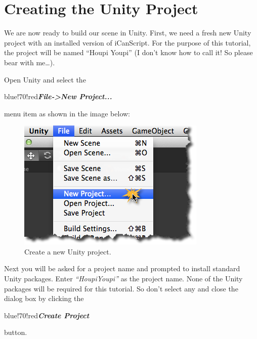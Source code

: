 \chapter{Creating the Unity Project}
\label{creatingtheunityproject}

We are now ready to build our scene in Unity. First, we need a fresh new Unity project with an installed version of iCanScript. For the purpose of this tutorial, the project will be named ``Houpi Youpi'' (I don't know how to call it! So please bear with me{\ldots}).

Open Unity and select the \begin{color}{blue!70!red}\emph{\textbf{File->New Project...}}\end{color} menu item as shown in the image below:

\begin{figure}[htbp]
\centering
\includegraphics[keepaspectratio,width=\textwidth,height=0.75\textheight]{unity-new-project.png}
\caption{Create a new Unity project.}
\label{unity-new-project.png}
\end{figure}

Next you will be asked for a project name and prompted to install standard Unity packages. Enter \emph{``HoupiYoupi''} as the project name. None of the Unity packages will be required for this tutorial. So don't select any and close the dialog box by clicking the \begin{color}{blue!70!red}\emph{\textbf{Create Project}}\end{color} button.

